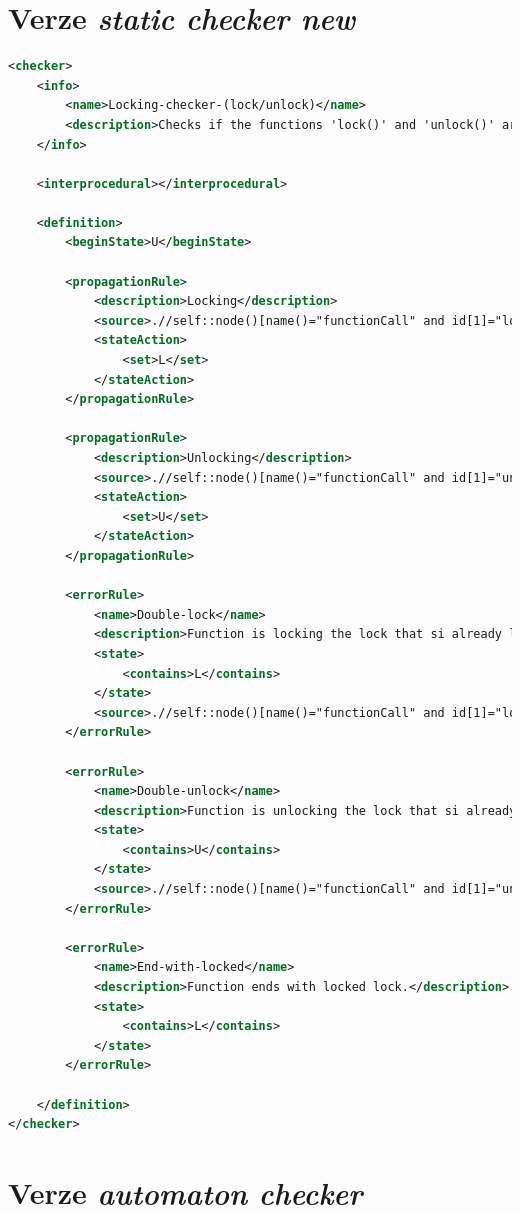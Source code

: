 \documentclass[11pt,final,oneside]{fithesis}
\begin{document}
\section{Verze \textit{static checker new}}

\begin{lstlisting}[language=XML,caption=Zápis definičního souboru pro \textit{static checker new},label=example-newchecker]
<checker>
    <info>
        <name>Locking-checker-(lock/unlock)</name>
        <description>Checks if the functions 'lock()' and 'unlock()' are correctly paired.</description>
    </info>

    <interprocedural></interprocedural>

    <definition>
        <beginState>U</beginState>

        <propagationRule>
            <description>Locking</description>
            <source>.//self::node()[name()="functionCall" and id[1]="lock"]</source>
            <stateAction>
                <set>L</set>
            </stateAction>
        </propagationRule>

        <propagationRule>
            <description>Unlocking</description>
            <source>.//self::node()[name()="functionCall" and id[1]="unlock"]</source>
            <stateAction>
                <set>U</set>
            </stateAction>
        </propagationRule>

        <errorRule>
            <name>Double-lock</name>
            <description>Function is locking the lock that si already locked.</description>
            <state>
                <contains>L</contains>
            </state>
            <source>.//self::node()[name()="functionCall" and id[1]="lock"]</source>
        </errorRule>

        <errorRule>
            <name>Double-unlock</name>
            <description>Function is unlocking the lock that si already unlocked.</description>
            <state>
                <contains>U</contains>
            </state>
            <source>.//self::node()[name()="functionCall" and id[1]="unlock"]</source>
        </errorRule>

        <errorRule>
            <name>End-with-locked</name>
            <description>Function ends with locked lock.</description>
            <state>
                <contains>L</contains>
            </state>
        </errorRule>

    </definition>
</checker>
\end{lstlisting}

\section{Verze \textit{automaton checker}}
\end{document}
